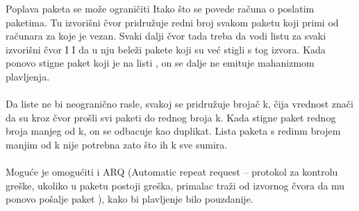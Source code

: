 \documentclass{article} %
\begin{document}
Poplava paketa se može ograničiti Itako što se povede računa o poslatim paketima. Tu izvorišni čvor pridružuje redni broj svakom paketu koji primi od računara za koje je vezan. Svaki dalji čvor tada treba da vodi listu za svaki izvorišni čvor I I da u nju beleži pakete koji su već stigli s tog izvora. Kada ponovo stigne paket koji je na listi , on se dalje ne emituje mahanizmom plavljenja.\\
\\
Da liste ne bi neogranično rasle, svakoj se pridružuje brojač k, čija vrednost znači da su kroz čvor prošli svi paketi do  rednog broja k. Kada stigne paket rednog broja manjeg od k, on se odbacuje kao duplikat. Lista paketa s redinm brojem manjim od k nije potrebna zato što ih k sve sumira.\\
\\
Moguće je omogućiti i ARQ (Automatic repeat request – protokol za kontrolu greške, ukoliko u paketu postoji greška, primalac traži od izvornog čvora da mu ponovo pošalje paket ), kako bi plavljenje bilo pouzdanije. 
\end{document}
